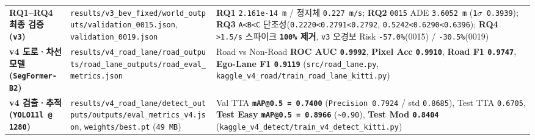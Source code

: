 \documentclass[10.5pt,a4paper]{article}
\begin{document}
\begin{footnotesize}
\begin{longtable}{>{\raggedright\arraybackslash}p{} >{\raggedright\arraybackslash}p{} >{\raggedright\arraybackslash}p{}}
\textbf{RQ1--RQ4 최종 검증 (\texttt{v3})} & \texttt{results/\allowbreak{}v3\_\allowbreak{}bev\_\allowbreak{}fixed/\allowbreak{}world\_\allowbreak{}outputs/\allowbreak{}validation\_\allowbreak{}0015.\allowbreak{}json}, \texttt{validation\_\allowbreak{}0019.\allowbreak{}json} & \textbf{RQ1} \texttt{2.\allowbreak{}161e-\allowbreak{}14 m} / 정지체 \texttt{0.\allowbreak{}227 m/\allowbreak{}s}; \textbf{RQ2} \texttt{0015} ADE \texttt{3.\allowbreak{}6052 m} (\texttt{1$\sigma$ 0.\allowbreak{}3939}); \textbf{RQ3} \texttt{A<B<C} 단조성(\texttt{0.\allowbreak{}2220<0.\allowbreak{}2791<0.\allowbreak{}2792}, \texttt{0.\allowbreak{}5242<0.\allowbreak{}6290<0.\allowbreak{}6396}); \textbf{RQ4} \texttt{>1.\allowbreak{}5/\allowbreak{}s} 스파이크 \textbf{\texttt{100\%} 제거}, \texttt{v3} 오경보 Risk \texttt{-\allowbreak{}57.\allowbreak{}0\%}(0015) / \texttt{-\allowbreak{}30.\allowbreak{}5\%}(0019) \\
\textbf{v4 도로·차선 모델 (\texttt{SegFormer-\allowbreak{}B2})} & \texttt{results/\allowbreak{}v4\_\allowbreak{}road\_\allowbreak{}lane/\allowbreak{}road\_\allowbreak{}outputs/\allowbreak{}road\_\allowbreak{}lane\_\allowbreak{}outputs/\allowbreak{}road\_\allowbreak{}eval\_\allowbreak{}metrics.\allowbreak{}json} & Road vs Non-Road \textbf{ROC AUC \texttt{0.\allowbreak{}9992}}, \textbf{Pixel Acc \texttt{0.\allowbreak{}9910}}, \textbf{Road F1 \texttt{0.\allowbreak{}9747}}, \textbf{Ego-Lane F1 \texttt{0.\allowbreak{}9119}} (\texttt{src/\allowbreak{}road\_\allowbreak{}lane.\allowbreak{}py}, \texttt{kaggle\_\allowbreak{}v4\_\allowbreak{}road/\allowbreak{}train\_\allowbreak{}road\_\allowbreak{}lane\_\allowbreak{}kitti.\allowbreak{}py}) \\
\textbf{v4 검출·추적 (\texttt{YOLO11l @ 1280})} & \texttt{results/\allowbreak{}v4\_\allowbreak{}road\_\allowbreak{}lane/\allowbreak{}detect\_\allowbreak{}outputs/\allowbreak{}outputs/\allowbreak{}eval\_\allowbreak{}metrics\_\allowbreak{}v4.\allowbreak{}json}, \texttt{weights/\allowbreak{}best.\allowbreak{}pt} (\texttt{49 MB}) & Val TTA \textbf{\texttt{mAP@0.\allowbreak{}5 = 0.\allowbreak{}7400}} (\texttt{Precision 0.\allowbreak{}7924} / std \texttt{0.\allowbreak{}8685}), Test TTA \texttt{0.\allowbreak{}6705}, \textbf{Test Easy \texttt{mAP@0.\allowbreak{}5 = 0.\allowbreak{}8966}} (\texttt{\textasciitilde{}0.\allowbreak{}90}), \textbf{Test Mod \texttt{0.\allowbreak{}8404}} (\texttt{kaggle\_\allowbreak{}v4\_\allowbreak{}detect/\allowbreak{}train\_\allowbreak{}v4\_\allowbreak{}detect\_\allowbreak{}kitti.\allowbreak{}py}) \\

\end{longtable}
\end{footnotesize}
\end{document}
